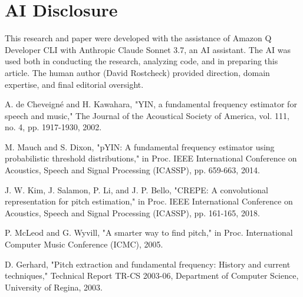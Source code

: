 \documentclass[conference]{IEEEtran}
\begin{document}
\section*{AI Disclosure}
This research and paper were developed with the assistance of Amazon Q Developer CLI with Anthropic Claude Sonnet 3.7, an AI assistant. The AI was used both in conducting the research, analyzing code, and in preparing this article. The human author (David Rostcheck) provided direction, domain expertise, and final editorial oversight.

\begin{thebibliography}{00}
 A. de Cheveigné and H. Kawahara, "YIN, a fundamental frequency estimator for speech and music," The Journal of the Acoustical Society of America, vol. 111, no. 4, pp. 1917-1930, 2002.

 M. Mauch and S. Dixon, "pYIN: A fundamental frequency estimator using probabilistic threshold distributions," in Proc. IEEE International Conference on Acoustics, Speech and Signal Processing (ICASSP), pp. 659-663, 2014.

 J. W. Kim, J. Salamon, P. Li, and J. P. Bello, "CREPE: A convolutional representation for pitch estimation," in Proc. IEEE International Conference on Acoustics, Speech and Signal Processing (ICASSP), pp. 161-165, 2018.

 P. McLeod and G. Wyvill, "A smarter way to find pitch," in Proc. International Computer Music Conference (ICMC), 2005.

 D. Gerhard, "Pitch extraction and fundamental frequency: History and current techniques," Technical Report TR-CS 2003-06, Department of Computer Science, University of Regina, 2003.

\end{thebibliography}
\end{document}
